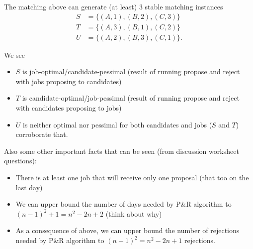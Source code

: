 The matching above can generate (at least) 3 stable matching instances \begin{align*}
    S &= \{(A,1), (B,2), (C,3)\} \\
    T &= \{(A,3), (B,1), (C,2)\} \\
    U &= \{(A,2), (B,3), (C,1)\}. 
\end{align*}

We see \begin{itemize}
    \item $S$ is job-optimal/candidate-pessimal (result of running propose and reject with jobs proposing to candidates)
    \item $T$ is candidate-optimal/job-pessimal (result of running propose and reject with candidates proposing to jobs)
    \item $U$ is neither optimal nor pessimal for both candidates and jobs ($S$ and $T$) corroborate that. 
\end{itemize}

Also some other important facts that can be seen (from discussion worksheet questions):
\begin{itemize}
    \item There is at least one job that will receive only one proposal (that too on the last day)
    \item We can upper bound the number of days needed by P\&R algorithm to $(n-1)^2 + 1 = n^2-2n+2$ (think about why)
    \item As a consequence of above, we can upper bound the number of rejections needed by P\&R algorithm to $(n-1)^2  = n^2 - 2n + 1$ rejections. 
\end{itemize}